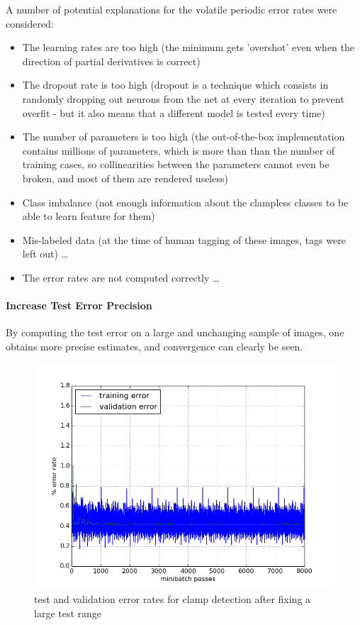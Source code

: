\documentclass[a4paper,11pt]{article}
\begin{document}
A number of potential explanations for the volatile periodic error rates were considered:
\begin{itemize}
\item The learning rates are too high (the minimum gets 'overshot' even when the direction of partial derivatives is correct)
\item The dropout rate is too high (dropout is a technique which consists in randomly dropping out neurons from the net at every iteration to prevent overfit - but it also means that a different model is tested every time)
\item The number of parameters is too high (the out-of-the-box implementation contains millions of parameters, which is more than than the number of training cases, so collinearities between the parameters cannot even be broken, and most of them are rendered useless)
\item Class imbalance (not enough information about the clampless classes to be able to learn feature for them)
\item Mis-labeled data (at the time of human tagging of these images, tags were left out) \ldots
\item The error rates are not computed correctly \ldots
\end{itemize}


\paragraph{Increase Test Error Precision}

By computing the test error on a large and unchanging sample of images, one obtains more precise estimates, and convergence can clearly be seen.

\begin{figure}[h!]
	\centering
	\includegraphics[scale=0.5]{images/increase_test_precision.png}
	\caption{test and validation error rates for clamp detection after fixing a large test range}
\end{figure}
\end{document}
